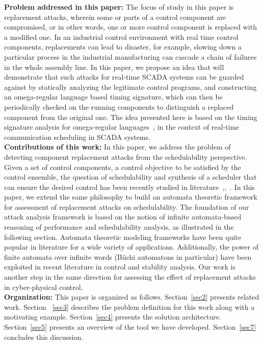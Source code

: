 \noindent
{\bf Problem addressed in this paper:} The focus of study in this paper is replacement attacks, wherein some or parts of a control component 
are compromised, or in other words, one or more control component is replaced with a modified one.  In an industrial control environment with real time control components, replacements can lead to disaster, for example, slowing down a
particular process in the industrial manufacturing can cascade a chain of failures in the whole
assembly line. In this paper, we propose an idea that will demonstrate that such
attacks for real-time SCADA systems can be guarded against by statically analyzing the
legitimate control programs, and constructing an omega-regular language based timing signature,
which can then be periodically checked on the running components to distinguish a replaced
component from the original one. The idea presented here is based on the timing signature analysis for omega-regular languages~\cite{WeissFAA09}, in the context of real-time communication scheduling
in SCADA systems. \\

\noindent
{\bf Contributions of this work:}
In this paper, we address the problem of detecting component replacement attacks from the schedulability perspective. Given a set of control components, a control objective 
to be satisfied by the control ensemble, the question of schedulability and 
synthesis of a scheduler that can ensure the desired control has been recently studied in literature~\cite{WeissFAA09},\cite{AlurW08},~\cite{GhoshMDHD16}. 
In this paper, we extend the same philosophy to build an automata theoretic framework for assessment of replacement attacks on schedulability. The foundation of our attack analysis framework is based on the notion of infinite automata-based reasoning of performance and schedulability analysis, as illustrated in the following section. Automata theoretic modeling frameworks have been quite popular in literature for a wide variety of applications. Additionally, the power of finite automata over infinite words (B\"{u}chi automatons in particular) have been exploited in recent literature in control and stability analysis. Our work is another step in the same direction for assessing the effect of replacement attacks in cyber-physical control. \\


\noindent
{\bf Organization:} This paper is organized as follows. Section~\ref{sec2} presents related work. Section ~\ref{sec3} describes the problem definition for this work along with a motivating example. Section~\ref{sec4} presents the solution architecture. Section~\ref{sec5} presents an overview of the tool we have developed. Section~\ref{sec7} concludes this discussion.
